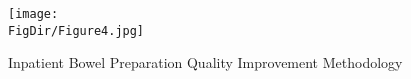 \hypertarget{Inpatient Bowel Preparation Quality Improvement Methodology}{}
\begin{figure}
    \centerline{\texttt{[image: \\FigDir/Figure4.jpg]}}
    \caption{Inpatient Bowel Preparation Quality Improvement Methodology}
    \label{fig:method}
\end{figure} 
